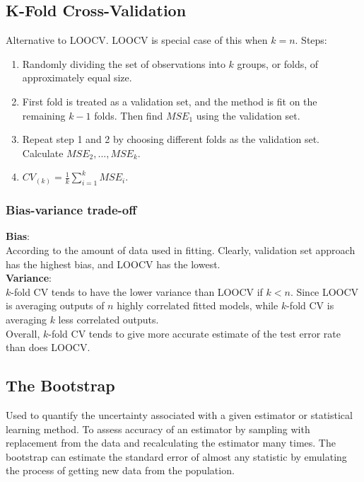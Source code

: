 \documentclass[11pt]{article}
\begin{document}
\subsection{K-Fold Cross-Validation}
\noindent Alternative to LOOCV. LOOCV is special case of this when $k=n$. Steps:
\begin{enumerate}
    \item Randomly dividing the set of observations into $k$ groups, or folds, of approximately equal size.
    \item First fold is treated as a validation set, and the method is fit on the remaining $k-1$ folds. Then find $MSE_1$ using the validation set.
    \item Repeat step 1 and 2 by choosing different folds as the validation set. Calculate $MSE_2,...,MSE_k$.
    \item $CV_{(k)} = \frac{1}{k}\sum_{i=1}^{k}{MSE_i}$.
\end{enumerate} \phantom{i}

\subsubsection{Bias-variance trade-off}
\noindent \textbf{Bias}: \\
\noindent According to the amount of data used in fitting. Clearly, validation set approach has the highest bias, and LOOCV has the lowest. \\

\noindent \textbf{Variance}: \\
\noindent $k$-fold CV tends to have the lower variance than LOOCV if $k < n$. Since LOOCV is averaging outputs of $n$ highly correlated fitted models, while $k$-fold CV is averaging $k$ less correlated outputs. \\

\noindent Overall, $k$-fold CV tends to give more accurate estimate of the test error rate than does LOOCV.

\subsection{The Bootstrap}
\noindent Used to quantify the uncertainty associated with a given estimator or statistical learning method. To assess accuracy of an estimator by sampling with replacement from the data and recalculating the estimator many times. The bootstrap can estimate the standard error of almost any statistic by emulating the process of getting new data from the population.
\end{document}
